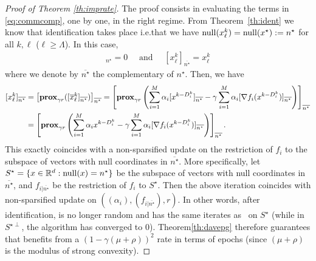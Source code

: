 \begin{proof}[Proof of Theorem \ref{th:imprate}]
The proof consists in evaluating the terms in \eqref{eq:commcomp}, one by one, in the right regime. 
From Theorem~\ref{th:ident} we know that identification takes place i.e.\;that we have $\mathrm{null}(x^k_\ell) = \mathrm{null}(x^\star) := n^\star$ for all $k,\ell$ ($\ell\geq\Lambda$).
In this case, 
\begin{align*}
    [x^k_\ell]_{n^\star} = 0 \quad\text{ and }\quad [x^k_\ell]_{\overline{n^\star}} = x_\ell^k
\end{align*}
where we denote by $\overline{n^\star}$ the complementary of $n^\star$. Then, we have
\begin{align*}
  \nonumber   [x^k_\ell]_{\overline{n^\star}}  
  &=\left[\mathbf{prox}_{\gamma r}([\overline{x}^k_\ell]_{\overline{n^\star}})\right]_{\overline{n^\star}}  
  = \left[\mathbf{prox}_{\gamma r}\left(\sum_{i=1}^M \alpha_i [x^{k-D_i^k}]_{\overline{n^\star}} - \gamma \sum_{i=1}^M \alpha_i [\nabla f_i(x^{k-D_i^k})]_{\overline{n^\star}} \right)\right]_{\overline{n^\star}} \\
     &=  \left[\mathbf{prox}_{\gamma r}\left(\sum_{i=1}^M \alpha_i x^{k-D_i^k} - \gamma \sum_{i=1}^M \alpha_i [\nabla f_i(x^{k-D_i^k})]_{\overline{n^\star}} \right)\right]_{\overline{n^\star}}.
\end{align*}
This exactly coincides with a non-sparsified update on the restriction of $f_i$ to the subspace of vectors with null coordinates in ${\overline{n^\star}}$. More specifically, let $S^\star = \{ x\in \mathbb{R}^d : \mathrm{null}(x) = n^\star \}$ be the subspace of vectors with null coordinates in ${\overline{n^\star}}$, and
$f_{i|{\overline{n^\star}}}$ be the restriction of $f_i$ to $S^\star$.
Then the above iteration coincides with non-sparsified update on
$((\alpha_i),(f_{i|{\overline{n^\star}}}),r)$. In other words, after identification, \salgo is no longer random and has the same iterates as \dave~on $S^\star$ (while in $S^{\star\perp}$, the algorithm has converged to $0$). Theorem\;\ref{th:davepg} therefore guarantees that \salgo benefits from a $(1-\gamma (\mu+\rho))^2$ rate in terms of epochs (since $(\mu+\rho)$ is the modulus of strong convexity).
\end{proof}


